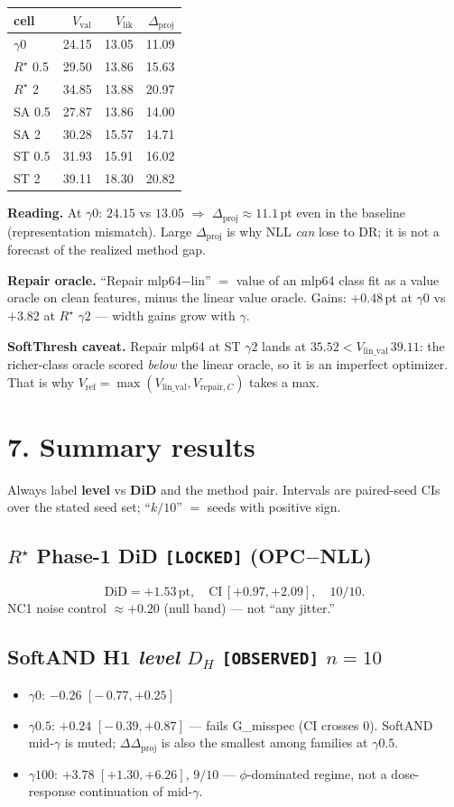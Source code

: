\documentclass[11pt]{article}
\newcommand{\phonesection}[1]{\Needspace{8\baselineskip}\section*{#1}}
\newcommand{\phonesub}[1]{\Needspace{6\baselineskip}\subsection*{#1}}
\newcommand{\stag}[1]{\texttt{[#1]}}
\newcommand{\Rstar}{R^{\star}}
\newcommand{\Dproj}{\Delta_{\mathrm{proj}}}
\newcommand{\DDproj}{\Delta\Delta_{\mathrm{proj}}}
\begin{document}
\begin{tabularx}{\linewidth}{@{}Xrrr@{}}
\toprule
cell & $V_{\mathrm{val}}$ & $V_{\mathrm{lik}}$ & $\Dproj$ \\
\midrule
$\gamma0$ & 24.15 & 13.05 & 11.09 \\
$\Rstar$ 0.5 & 29.50 & 13.86 & 15.63 \\
$\Rstar$ 2 & 34.85 & 13.88 & 20.97 \\
SA 0.5 & 27.87 & 13.86 & 14.00 \\
SA 2 & 30.28 & 15.57 & 14.71 \\
ST 0.5 & 31.93 & 15.91 & 16.02 \\
ST 2 & 39.11 & 18.30 & 20.82 \\
\bottomrule
\end{tabularx}

\textbf{Reading.}
At $\gamma0$: $24.15$ vs $13.05$ $\Rightarrow$
$\Dproj\approx 11.1$\,pt even in the baseline
(representation mismatch).  Large $\Dproj$
is why NLL \emph{can} lose to DR; it is not
a forecast of the realized method gap.

\textbf{Repair oracle.}
``Repair mlp64$-$lin'' $=$ value of an
mlp64 class fit as a value oracle on clean
features, minus the linear value oracle.
Gains: $+0.48$\,pt at $\gamma0$ vs $+3.82$
at $\Rstar$ $\gamma2$ --- width gains grow
with $\gamma$.

\textbf{SoftThresh caveat.}
Repair mlp64 at ST $\gamma2$ lands at
$35.52 < V_{\mathrm{lin\_val}}\,39.11$: the
richer-class oracle scored \emph{below} the
linear oracle, so it is an imperfect
optimizer.  That is why
$V_{\mathrm{ref}}=\max(V_{\mathrm{lin\_val}},
V_{\mathrm{repair},C})$ takes a max.

\phonesection{7. Summary results}

Always label \textbf{level} vs \textbf{DiD}
and the method pair.  Intervals are
paired-seed CIs over the stated seed set;
``$k/10$'' $=$ seeds with positive sign.

\phonesub{$\Rstar$ Phase-1 DiD \stag{LOCKED}
(OPC$-$NLL)}
\[
\mathrm{DiD}=+1.53\,\mathrm{pt},\quad
\mathrm{CI}\,[+0.97,+2.09],\quad 10/10.
\]
NC1 noise control $\approx +0.20$ (null band)
--- not ``any jitter.''

\phonesub{SoftAND H1 \emph{level} $D_{H}$
\stag{OBSERVED} $n{=}10$}
\begin{itemize}
  \item $\gamma0$: $-0.26$ $[-\,0.77,+0.25]$
  \item $\gamma0.5$: $+0.24$ $[-\,0.39,+0.87]$
        --- fails G\_misspec (CI crosses 0).
        SoftAND mid-$\gamma$ is muted;
        $\DDproj$ is also the smallest among
        families at $\gamma0.5$.
  \item $\gamma100$: $+3.78$ $[+1.30,+6.26]$,
        $9/10$ --- $\phi$-dominated regime,
        not a dose-response continuation of
        mid-$\gamma$.
\end{itemize}
\end{document}
